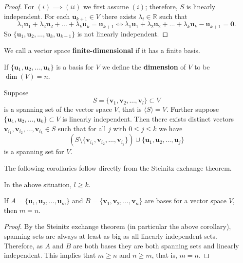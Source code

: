 \begin{proof}
    For $(i) \implies (ii)$ we first assume $(i)$; therefore, $S$ is linearly independent. For each $\bm{u}_{k + 1} \in V$ there exists $\lambda_i \in \mathbb{R}$ such that \[\lambda_1 \bm{u}_1 + \lambda_2 \bm{u}_2 + \ldots + \lambda_k \bm{u}_k = \bm{u}_{k + 1} \iff \lambda_1 \bm{u}_1 + \lambda_2 \bm{u}_2 + \ldots + \lambda_k \bm{u}_k - \bm{u}_{k+1} = \bm{0}.\] So $\{\bm{u}_1, \bm{u}_2, \ldots, \bm{u}_k, \bm{u}_{k+1}\}$ is not linearly independent. 
\end{proof}

\begin{definition}
    We call a vector space \textbf{finite-dimensional} if it has a finite basis.
\end{definition}

\begin{definition}
    If $\{\bm{u}_1, \bm{u}_2, \ldots, \bm{u}_k\}$ is a basis for $V$ we define the \textbf{dimension} of $V$ to be $\dim(V)=n$.
\end{definition}

\begin{theorem}
    Suppose \[S=\{\bm{v}_1, \bm{v}_2, \ldots, \bm{v}_l\} \subset V\] is a spanning set of the vector space $V$, that is $\langle S \rangle = V$. Further suppose $\{\bm{u}_1, \bm{u}_2, \ldots, \bm{u}_k\} \subset V$ is linearly independent. Then there exists distinct vectors $\bm{v}_{i_{1}}, \bm{v}_{i_{2}}, \ldots, \bm{v}_{i_{k}} \in S$ such that for all $j$ with $0 \leq j \leq k$ we have \[(S \setminus \{\bm{v}_{i_{1}}, \bm{v}_{i_{2}}, \ldots, \bm{v}_{i_{j}}\}) \cup \{\bm{u}_1, \bm{u}_2, \ldots, \bm{u}_j\}\] is a spanning set for $V$.
\end{theorem}

The following corollaries follow directly from the Steinitz exchange theorem.

\begin{corollary}
    In the above situation, $l \geq k$.
\end{corollary}

\begin{corollary}
    If $A = \{\bm{u}_1, \bm{u}_2, \ldots, \bm{u}_m\}$ and $B = \{\bm{v}_1, \bm{v}_2, \ldots, \bm{v}_n\}$ are bases for a vector space $V$, then $m = n$.
\end{corollary}

\begin{proof}
    By the Steinitz exchange theorem (in particular the above corollary), spanning sets are always at least as big as all linearly independent sets. Therefore, as $A$ and $B$ are both bases they are both spanning sets and linearly independent. This implies that $m \geq n$ and $n \geq m$, that is, $m = n$.
\end{proof}

